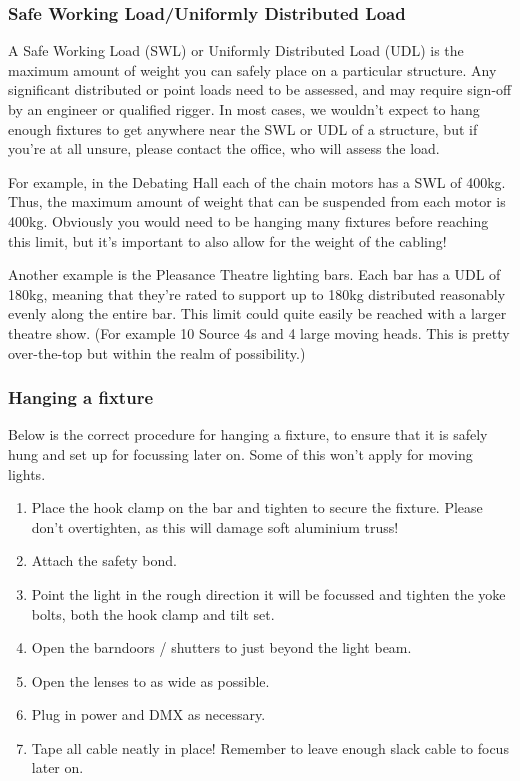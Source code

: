 \documentclass[14pt]{article} %
\begin{document}
\subsubsection{Safe Working Load/Uniformly Distributed Load}
A Safe Working Load (SWL) or Uniformly Distributed Load (UDL) is the maximum amount of weight you can safely place on a particular structure. Any significant distributed or point loads need to be assessed, and may require sign-off by an engineer or qualified rigger. In most cases, we wouldn’t expect to hang enough fixtures to get anywhere near the SWL or UDL of a structure, but if you’re at all unsure, please contact the office, who will assess the load.

For example, in the Debating Hall each of the chain motors has a SWL of 400kg. Thus, the maximum amount of weight that can be suspended from each motor is 400kg. Obviously you would need to be hanging many fixtures before reaching this limit, but it’s important to also allow for the weight of the cabling!

Another example is the Pleasance Theatre lighting bars. Each bar has a UDL of 180kg, meaning that they’re rated to support up to 180kg distributed reasonably evenly along the entire bar. This limit could quite easily be reached with a larger theatre show. (For example 10 Source 4s and 4 large moving heads. This is pretty over-the-top but within the realm of possibility.)

\subsubsection{Hanging a fixture}
Below is the correct procedure for hanging a fixture, to ensure that it is safely hung and set up for focussing later on. Some of this won’t apply for moving lights.
\begin{enumerate}
\item	Place the hook clamp on the bar and tighten to secure the fixture. Please don’t overtighten, as this will damage soft aluminium truss!
\item	Attach the safety bond.
\item	Point the light in the rough direction it will be focussed and tighten the yoke bolts, both the hook clamp and tilt set.
\item	Open the barndoors / shutters to just beyond the light beam.
\item	Open the lenses to as wide as possible.
\item	Plug in power and DMX as necessary.
\item	Tape all cable neatly in place! Remember to leave enough slack cable to focus later on.
\end{enumerate}
\end{document}

